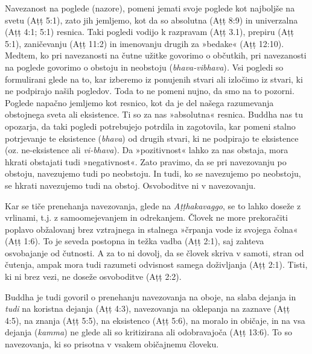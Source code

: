Navezanost na poglede (nazore), pomeni jemati svoje poglede kot
najboljše na svetu (Aṭṭ 5:1), zato jih jemljemo, kot da so absolutna
(Aṭṭ 8:9) in univerzalna (Aṭṭ 4:1; 5:1) resnica. Taki pogledi vodijo k
razpravam (Aṭṭ 3.1), prepiru (Aṭṭ 5:1), zaničevanju (Aṭṭ 11:2) in
imenovanju drugih za »bedake« (Aṭṭ 12:10). Medtem, ko pri navezanosti na
čutne užitke govorimo o občutkih, pri navezanosti na poglede govorimo o
obstoju in neobstoju (\emph{bhava-vibhava})\emph{.} Vsi pogledi so
formulirani glede na to, kar izberemo iz ponujenih stvari ali izločimo
iz stvari, ki ne podpirajo naših pogledov. Toda to ne pomeni nujno, da
smo na to pozorni. Poglede napačno jemljemo kot resnico, kot da je del
našega razumevanja obstojnega sveta ali eksistence. Ti so za nas
»absolutna« resnica. Buddha nas tu opozarja, da taki pogledi potrebujejo
potrdila in zagotovila, kar pomeni stalno potrjevanje te eksistence
(\emph{bhava}) od drugih stvari, ki ne podpirajo te eksistence (oz.
ne-eksistence ali \emph{vi-bhava}). Da »pozitivnost« lahko za nas
obstaja, mora hkrati obstajati tudi »negativnost«. Zato pravimo, da se
pri navezovanju po obstoju, navezujemo tudi po neobstoju. In tudi, ko se
navezujemo po neobstoju, se hkrati navezujemo tudi na obstoj.
Osvoboditve ni v navezovanju.

Kar se tiče prenehanja navezovanja, glede na \emph{Aṭṭhakavaggo}, se to
lahko doseže z vrlinami, t.j. z samoomejevanjem in odrekanjem. Človek ne
more prekoračiti poplavo obžalovanj brez vztrajnega in stalnega »črpanja
vode iz svojega čolna« (Aṭṭ 1:6). To je seveda postopna in težka vadba
(Aṭṭ 2:1), saj zahteva osvobajanje od čutnosti. A za to ni dovolj, da se
človek skriva v samoti, stran od čutenja, ampak mora tudi razumeti
odvisnost samega doživljanja (Aṭṭ 2:1). Tisti, ki ni brez vezi, ne
doseže osvoboditve (Aṭṭ 2:2).

Buddha je tudi govoril o prenehanju navezovanja na oboje, na slaba
dejanja in \emph{tudi} na koristna dejanja (Aṭṭ 4:3), navezovanja na
oklepanja na zaznave (Aṭṭ 4:5), na znanja (Aṭṭ 5:5), na eksistenco (Aṭṭ
5:6), na moralo in običaje, in na vsa dejanja (\emph{kamma}) ne glede
ali so kritizirana ali odobravajoča (Aṭṭ 13:6). To so navezovanja, ki so
prisotna v vsakem običajnemu človeku.

